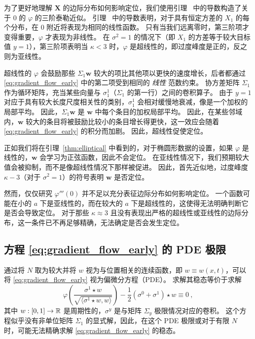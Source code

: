 为了更好地理解 $\mathbf{X}$ 的边际分布如何影响定位，我们使用引理~ 中的导数构造了关于 0 的 $\varphi$ 的三阶泰勒近似。
引理~ 中的导数表明，对于具有恒定方差的 $X_1$ 的每个分布，在 0 附近将表现为相同的线性函数。
只有当我们远离零时，第三阶项才变得重要，$\varphi$ 才表现为非线性。
在 $\sigma^2 = 1$ 的情况下（即 $X_1$ 的方差等于较大目标值 $y=1$），第三阶项表明当 $\kappa < 3$ 时，$\varphi$ 是超线性的，即过度峰度是正的，反之则为亚线性。

超线性的 $\varphi$ 会鼓励那些 $\Sigma_1 \mathbf{w}$ 较大的项比其他项以更快的速度增长，后者都通过 \cref{eq:gradient_flow_early} 中的第二项受到相同的 \emph{线性} 范数约束。
协方差矩阵 $\Sigma_1$ 作为循环矩阵，充当某些向量与 $\sigma_1^1$（$\Sigma_1$ 的第一行）之间的卷积算子。
由于 $y=1$ 对应于具有较大长度尺度相关性的类别，$\sigma_1^1$ 会相对缓慢地衰减，像是一个加权的局部平均。
因此，$\Sigma_1 \mathbf{w}$ 是 $\mathbf{w}$ 中每个条目的加权局部平均。
因此，在某些邻域内，$\mathbf{w}$ 较大的条目将被鼓励比较小的条目增长得更快，这一效应会随着 \cref{eq:gradient_flow_early} 的积分而加剧。
因此，超线性促使定位。

正如我们将在引理~\ref{thm:elliptical} 中看到的，对于椭圆形数据的设置，如果 $\varphi$ 是线性的，$\mathbf{w}$ 会学习为正弦函数，因此不会定位。
在亚线性情况下，我们预期较大值会被抑制，而不是像超线性情况下那样被促进。
因此，首先近似地，过度峰度 $\kappa - 3$（对于 $\sigma^2 = 1$）的符号表明 $\mathbf{w}$ 是否定位。

然而，仅仅研究 $\varphi'''(0)$ 并不足以充分表征边际分布如何影响定位。
一个函数可能在小的 $a$ 下是亚线性的，而在较大的 $a$ 下是超线性的，这使得无法明确判断它是否会导致定位。
对于那些 $\kappa \approx 3$ 且没有表现出严格的超线性或亚线性的边际分布，这一条件已不再足够精确，无法确定是否会发生定位。
\subsection{方程 \cref{eq:gradient_flow_early} 的 PDE 极限}
\label{sec:pde-limit}

通过将 $N$ 取为较大并将 $w$ 视为与位置相关的连续函数，即 $w \equiv w(x, t)$，可以将 \cref{eq:gradient_flow_early} 视为偏微分方程（PDE）。  
求解其稳态等价于求解  
\begin{equation}
    \varphi\left( \frac{\sigma^1 \star w}{\sqrt{ \langle \sigma^1 \star w, w \rangle}} \right) - \frac{1}{2} (\sigma^0 + \sigma^1) \star w \equiv 0~,
\end{equation}  
其中 $w : [0,1] \to \operatorname{\mathbb{R}}$ 是周期性的，$\sigma^y$ 是与矩阵 $\Sigma_y$ 极限情况对应的卷积。  
这个方程似乎没有非单位矩阵 $\Sigma_1$ 的显式解，因此，在这个 PDE 极限或对于有限 $N$ 时，可能无法精确求解 \cref{eq:gradient_flow_early} 的稳态。
